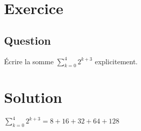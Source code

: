 \documentclass{article}
\begin{document}
\section{Exercice}

\subsection*{Question}
Écrire la somme $ \displaystyle{\sum_{k= 0 }^{ 4 }} 2^{k + 3} $ explicitement.

\section{Solution}
$ \displaystyle{\sum_{k= 0 }^{ 4 }} 2^{k + 3} = 8 + 16 + 32 + 64 + 128 $
\end{document}
